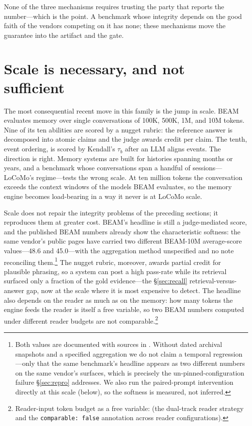 \documentclass[11pt]{article}
\begin{document}
None of the three mechanisms requires trusting the party that reports the number---which is the point. A benchmark whose integrity depends on the good faith of the vendors competing on it has none; these mechanisms move the guarantee into the artifact and the gate.

\section{Scale is necessary, and not sufficient}\label{sec:scale}

The most consequential recent move in this family is the jump in scale. BEAM\citep{beam} evaluates memory over single conversations of 100K, 500K, 1M, and 10M tokens. Nine of its ten abilities are scored by a nugget rubric: the reference answer is decomposed into atomic claims and the judge awards credit per claim. The tenth, event ordering, is scored by Kendall's $\tau_b$ after an LLM aligns events. The direction is right. Memory systems are built for histories spanning months or years, and a benchmark whose conversations span a handful of sessions---LoCoMo's regime---tests the wrong scale.\citep[\S5.4]{synthius} At ten million tokens the conversation exceeds the context windows of the models BEAM evaluates, so the memory engine becomes load-bearing in a way it never is at LoCoMo scale.

Scale does not repair the integrity problems of the preceding sections; it reproduces them at greater cost. BEAM's headline is still a judge-mediated score, and the published BEAM numbers already show the characteristic softness: the same vendor's public pages have carried two different BEAM-10M average-score values---48.6 and 45.0---with the aggregation method unspecified and no note reconciling them.\footnote{Both values are documented with sources in . Without dated archival snapshots and a specified aggregation we do not claim a temporal regression---only that the same benchmark's headline appears as two different numbers on the same vendor's surfaces, which is precisely the un-pinned-configuration failure \S\ref{sec:repro} addresses. We also run the paired-prompt intervention directly at this scale (below), so the softness is measured, not inferred.} The nugget rubric, moreover, awards partial credit for plausible phrasing, so a system can post a high pass-rate while its retrieval surfaced only a fraction of the gold evidence---the \S\ref{sec:recall} retrieval-versus-answer gap, now at the scale where it is most expensive to detect. The headline also depends on the reader as much as on the memory: how many tokens the engine feeds the reader is itself a free variable, so two BEAM numbers computed under different reader budgets are not comparable.\footnote{Reader-input token budget as a free variable:  (the dual-track reader strategy and the \texttt{comparable: false} annotation across reader configurations).}
\end{document}
